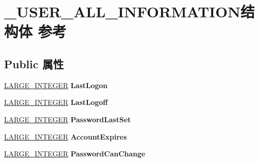 \hypertarget{struct___u_s_e_r___a_l_l___i_n_f_o_r_m_a_t_i_o_n}{}\section{\+\_\+\+U\+S\+E\+R\+\_\+\+A\+L\+L\+\_\+\+I\+N\+F\+O\+R\+M\+A\+T\+I\+O\+N结构体 参考}
\label{struct___u_s_e_r___a_l_l___i_n_f_o_r_m_a_t_i_o_n}
\subsection*{Public 属性}
\begin{DoxyCompactItemize}
\item 
\mbox{\label{struct___u_s_e_r___a_l_l___i_n_f_o_r_m_a_t_i_o_n_a8b8dbfae3a7c9d74c7cb46cfe76c12f2}} 
\hyperlink{union___l_a_r_g_e___i_n_t_e_g_e_r}{L\+A\+R\+G\+E\+\_\+\+I\+N\+T\+E\+G\+ER} {\bfseries Last\+Logon}
\item 
\mbox{\label{struct___u_s_e_r___a_l_l___i_n_f_o_r_m_a_t_i_o_n_ad6cc545f4706e50aaa03fb829203a77a}} 
\hyperlink{union___l_a_r_g_e___i_n_t_e_g_e_r}{L\+A\+R\+G\+E\+\_\+\+I\+N\+T\+E\+G\+ER} {\bfseries Last\+Logoff}
\item 
\mbox{\label{struct___u_s_e_r___a_l_l___i_n_f_o_r_m_a_t_i_o_n_a5591a64471d43878ccae0ee50db5e9ef}} 
\hyperlink{union___l_a_r_g_e___i_n_t_e_g_e_r}{L\+A\+R\+G\+E\+\_\+\+I\+N\+T\+E\+G\+ER} {\bfseries Password\+Last\+Set}
\item 
\mbox{\label{struct___u_s_e_r___a_l_l___i_n_f_o_r_m_a_t_i_o_n_a1ef6daccc3a317ef62960b05fcf4e0f7}} 
\hyperlink{union___l_a_r_g_e___i_n_t_e_g_e_r}{L\+A\+R\+G\+E\+\_\+\+I\+N\+T\+E\+G\+ER} {\bfseries Account\+Expires}
\item 
\mbox{\label{struct___u_s_e_r___a_l_l___i_n_f_o_r_m_a_t_i_o_n_a765f7e46f68b470a3d5cde25e9c6ed8d}} 
\hyperlink{union___l_a_r_g_e___i_n_t_e_g_e_r}{L\+A\+R\+G\+E\+\_\+\+I\+N\+T\+E\+G\+ER} {\bfseries Password\+Can\+Change}
\item 

\end{DoxyCompactItemize}
